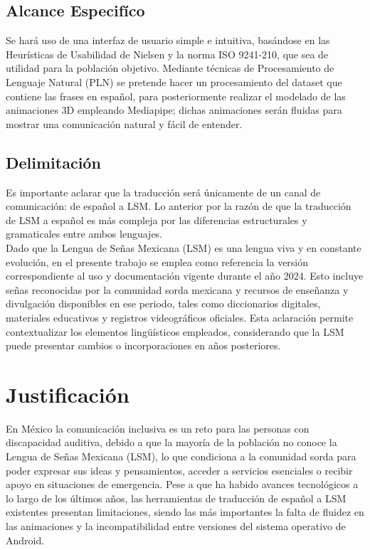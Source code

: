 \subsection{Alcance Especifíco}
Se hará uso de una interfaz de usuario simple e intuitiva, basándose en las Heurísticas de Usabilidad de Nielsen y la norma ISO 9241-210, que sea de utilidad para la población objetivo. Mediante técnicas de Procesamiento de Lenguaje Natural (PLN) se pretende hacer un procesamiento del dataset que contiene las frases en español, para posteriormente realizar el modelado de las animaciones 3D empleando Mediapipe; dichas animaciones serán fluidas para mostrar una comunicación natural y fácil de entender.

\subsection{Delimitación}
Es importante aclarar que la traducción será únicamente de un canal de comunicación: de español a LSM. Lo anterior por la razón de que la traducción de LSM a español es más compleja por las diferencias estructurales y gramaticales entre ambos lenguajes.\\

Dado que la Lengua de Señas Mexicana (LSM) es una lengua viva y en constante evolución, en el presente trabajo se emplea como referencia la versión correspondiente al uso y documentación vigente durante el año 2024. Esto incluye señas reconocidas por la comunidad sorda mexicana y recursos de enseñanza y divulgación disponibles en ese periodo, tales como diccionarios digitales, materiales educativos y registros videográficos oficiales. Esta aclaración permite contextualizar los elementos lingüísticos empleados, considerando que la LSM puede presentar cambios o incorporaciones en años posteriores.

\section{Justificación}
En México la comunicación inclusiva es un reto para las personas con discapacidad auditiva, debido a que la mayoría de la población no conoce la Lengua de Señas Mexicana (LSM), lo que condiciona a la comunidad sorda para poder expresar sus ideas y pensamientos, acceder a servicios esenciales o recibir apoyo en situaciones de emergencia. Pese a que ha habido avances tecnológicos a lo largo de los últimos años, las herramientas de traducción de español a LSM existentes presentan limitaciones, siendo las más importantes la falta de fluidez en las animaciones y la incompatibilidad entre versiones del sistema operativo de Android. \\

